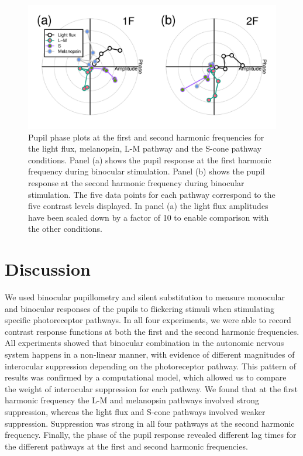 \documentclass[
]{article}
\begin{document}
\begin{figure}

{\centering \includegraphics{Figures/phaseplots} 

}

\caption{Pupil phase plots at the first and second harmonic frequencies for the light flux, melanopsin, L-M pathway and the S-cone pathway conditions. Panel (a) shows the pupil response at the first harmonic frequency during binocular stimulation. Panel (b) shows the pupil response at the second harmonic frequency during binocular stimulation. The five data points for each pathway correspond to the five contrast levels displayed. In panel (a) the light flux amplitudes have been scaled down by a factor of 10 to enable comparison with the other conditions.}\label{fig:phaseplots}
\end{figure}

\hypertarget{discussion}{%
\section{Discussion}\label{discussion}}

We used binocular pupillometry and silent substitution to measure monocular and binocular responses of the pupils to flickering stimuli when stimulating specific photoreceptor pathways. In all four experiments, we were able to record contrast response functions at both the first and the second harmonic frequencies. All experiments showed that binocular combination in the autonomic nervous system happens in a non-linear manner, with evidence of different magnitudes of interocular suppression depending on the photoreceptor pathway. This pattern of results was confirmed by a computational model, which allowed us to compare the weight of interocular suppression for each pathway. We found that at the first harmonic frequency the L-M and melanopsin pathways involved strong suppression, whereas the light flux and S-cone pathways involved weaker suppression. Suppression was strong in all four pathways at the second harmonic frequency. Finally, the phase of the pupil response revealed different lag times for the different pathways at the first and second harmonic frequencies.
\end{document}
